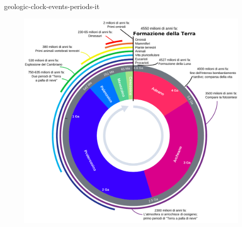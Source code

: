 \documentclass[preview]{standalone}
\begin{document}
\begin{snippet}{geologic-clock-events-periods-it}
    \begin{figure}[h]
        \begin{center}
            \includegraphics[width=.75\textwidth]{resources/geologic-clock-events-periods-it.pdf}
        \end{center}
    \end{figure}
\end{snippet}
\end{document}
